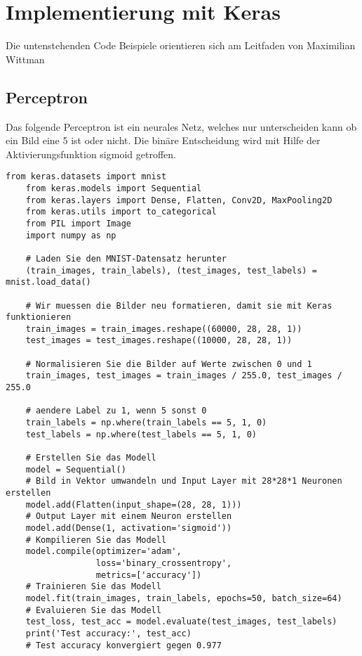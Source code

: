 \section{Implementierung mit Keras}\label{sec:code} 
Die untenstehenden Code Beispiele orientieren sich am Leitfaden von Maximilian Wittman \cite{WM20}
\subsection{Perceptron}
Das folgende Perceptron ist ein neurales Netz, welches nur unterscheiden kann ob ein Bild eine 5 ist oder nicht. Die binäre Entscheidung wird mit Hilfe
der Aktivierungsfunktion sigmoid getroffen.
\begin{lstlisting}[basicstyle=\ttfamily\footnotesize]
    from keras.datasets import mnist
    from keras.models import Sequential
    from keras.layers import Dense, Flatten, Conv2D, MaxPooling2D
    from keras.utils import to_categorical
    from PIL import Image
    import numpy as np
    
    # Laden Sie den MNIST-Datensatz herunter
    (train_images, train_labels), (test_images, test_labels) = mnist.load_data()
    
    # Wir muessen die Bilder neu formatieren, damit sie mit Keras funktionieren
    train_images = train_images.reshape((60000, 28, 28, 1))
    test_images = test_images.reshape((10000, 28, 28, 1))
    
    # Normalisieren Sie die Bilder auf Werte zwischen 0 und 1
    train_images, test_images = train_images / 255.0, test_images / 255.0
    
    # aendere Label zu 1, wenn 5 sonst 0
    train_labels = np.where(train_labels == 5, 1, 0)
    test_labels = np.where(test_labels == 5, 1, 0)
    
    # Erstellen Sie das Modell
    model = Sequential()
    # Bild in Vektor umwandeln und Input Layer mit 28*28*1 Neuronen erstellen
    model.add(Flatten(input_shape=(28, 28, 1)))
    # Output Layer mit einem Neuron erstellen
    model.add(Dense(1, activation='sigmoid'))
    # Kompilieren Sie das Modell
    model.compile(optimizer='adam',
                  loss='binary_crossentropy',
                  metrics=['accuracy'])
    # Trainieren Sie das Modell
    model.fit(train_images, train_labels, epochs=50, batch_size=64)
    # Evaluieren Sie das Modell
    test_loss, test_acc = model.evaluate(test_images, test_labels)
    print('Test accuracy:', test_acc)
    # Test accuracy konvergiert gegen 0.977
\end{lstlisting}


